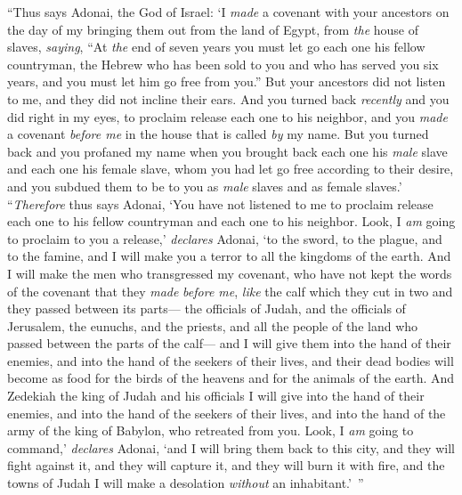 \begin{biblechapter}
\verse “Thus says Adonai, the God of Israel: ‘I \textit{made} a covenant with your ancestors on the day of my bringing them out from the land of Egypt, from \textit{the} house of slaves, \textit{saying},
\verse “At \textit{the} end of seven years you must let go each one his fellow countryman, the Hebrew who has been sold to you and who has served you six years, and you must let him go free from you.” But your ancestors did not listen to me, and they did not incline their ears.
\verse And you turned back \textit{recently} and you did right in my eyes, to proclaim release each one to his neighbor, and you \textit{made} a covenant \textit{before me} in the house that is called \textit{by} my name.
\verse But you turned back and you profaned my name when you brought back each one his \textit{male} slave and each one his female slave, whom you had let go free according to their desire, and you subdued them to be to you as \textit{male} slaves and as female slaves.’
\verse “\textit{Therefore} thus says Adonai, ‘You have not listened to me to proclaim release each one to his fellow countryman and each one to his neighbor. Look, I \textit{am} going to proclaim to you a release,’ \textit{declares} Adonai, ‘to the sword, to the plague, and to the famine, and I will make you a terror to all the kingdoms of the earth.
\verse And I will make the men who transgressed my covenant, who have not kept the words of the covenant that they \textit{made} \textit{before me}, \textit{like} the calf which they cut in two and they passed between its parts—
\verse the officials of Judah, and the officials of Jerusalem, the eunuchs, and the priests, and all the people of the land who passed between the parts of the calf—
\verse and I will give them into the hand of their enemies, and into the hand of the seekers of their lives, and their dead bodies will become as food for the birds of the heavens and for the animals of the earth.
\verse And Zedekiah the king of Judah and his officials I will give into the hand of their enemies, and into the hand of the seekers of their lives, and into the hand of the army of the king of Babylon, who retreated from you.
\verse Look, I \textit{am} going to command,’ \textit{declares} Adonai, ‘and I will bring them back to this city, and they will fight against it, and they will capture it, and they will burn it with fire, and the towns of Judah I will make a desolation \textit{without} an inhabitant.’ ”
\end{biblechapter}

